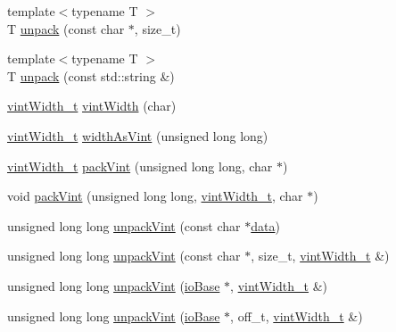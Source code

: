 \begin{DoxyCompactItemize}
{\footnotesize template$<$typename T $>$ }\\T \mbox{\hyperlink{namespaceebml_a55a0f9d0c93e80d488021fd03c4f3861}{unpack}} (const char $\ast$, size\+\_\+t)
\item 
{\footnotesize template$<$typename T $>$ }\\T \mbox{\hyperlink{namespaceebml_a33d2b669314c64b95ed6c37534b6b655}{unpack}} (const std\+::string \&)
\item 
\mbox{\hyperlink{namespaceebml_a2ccdfb60b23efb51fe07f9d066e23604}{vint\+Width\+\_\+t}} \mbox{\hyperlink{namespaceebml_a025ed44f4346fdb6573b2bf336797f27}{vint\+Width}} (char)
\item 
\mbox{\hyperlink{namespaceebml_a2ccdfb60b23efb51fe07f9d066e23604}{vint\+Width\+\_\+t}} \mbox{\hyperlink{namespaceebml_a39e20a7de94c1f11f941e6cf63af370c}{width\+As\+Vint}} (unsigned long long)
\item 
\mbox{\hyperlink{namespaceebml_a2ccdfb60b23efb51fe07f9d066e23604}{vint\+Width\+\_\+t}} \mbox{\hyperlink{namespaceebml_a0ccc1293a99e95cd38a5125cb7d15361}{pack\+Vint}} (unsigned long long, char $\ast$)
\item 
void \mbox{\hyperlink{namespaceebml_ab96b36c3bf5bae473a35bec372103006}{pack\+Vint}} (unsigned long long, \mbox{\hyperlink{namespaceebml_a2ccdfb60b23efb51fe07f9d066e23604}{vint\+Width\+\_\+t}}, char $\ast$)
\item 
unsigned long long \mbox{\hyperlink{namespaceebml_a7928e2829b2feaf2516b0b019b28bf65}{unpack\+Vint}} (const char $\ast$\mbox{\hyperlink{namespaceebml_ab21f8b4ff85186f670f17e84a02d9740}{data}})
\item 
unsigned long long \mbox{\hyperlink{namespaceebml_a28d35d96aa75eadb27676a59d6972506}{unpack\+Vint}} (const char $\ast$, size\+\_\+t, \mbox{\hyperlink{namespaceebml_a2ccdfb60b23efb51fe07f9d066e23604}{vint\+Width\+\_\+t}} \&)
\item 
unsigned long long \mbox{\hyperlink{namespaceebml_aa37686e968c0b4654851623ecd21bf0a}{unpack\+Vint}} (\mbox{\hyperlink{classebml_1_1ioBase}{io\+Base}} $\ast$, \mbox{\hyperlink{namespaceebml_a2ccdfb60b23efb51fe07f9d066e23604}{vint\+Width\+\_\+t}} \&)
\item 
unsigned long long \mbox{\hyperlink{namespaceebml_a897f00b5febf5789f251984ec046b8bf}{unpack\+Vint}} (\mbox{\hyperlink{classebml_1_1ioBase}{io\+Base}} $\ast$, off\+\_\+t, \mbox{\hyperlink{namespaceebml_a2ccdfb60b23efb51fe07f9d066e23604}{vint\+Width\+\_\+t}} \&)
\end{DoxyCompactItemize}
